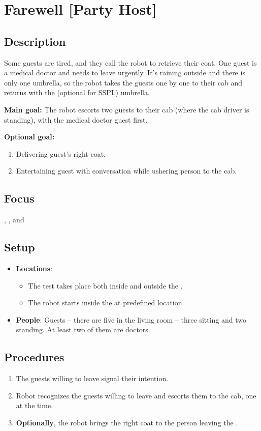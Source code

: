 \section{Farewell [Party Host]}
\label{test:farewell}

\subsection*{Description}
    Some guests are tired, and they call the robot to retrieve their coat. One guest is a medical doctor and needs to leave urgently. It's raining outside and there is only one umbrella, so the robot takes the guests one by one to their cab and returns with the (optional for SSPL) umbrella.


\textbf{Main goal:}
The robot escorts two guests to their cab (where the cab driver is standing), with the medical doctor guest first.


\textbf{Optional goal:}
\begin{enumerate}[nosep]
	\item Delivering guest's right coat.
	\item Entertaining guest with conversation while ushering person to the cab.
\end{enumerate}

\subsection*{Focus}
\PerDet{}, \NAV{}, and \HRI{}

\subsection*{Setup}
\begin{itemize}
	\item \textbf{Locations}: 
		\begin{itemize}
		 \item The test takes place both inside and outside the \Arena{}.
		 \item The robot starts inside the \Arena{} at predefined location.
		\end{itemize}
	\item \textbf{People}: Guests -- there are five  in the living room -- three sitting and two standing. At least two of them are doctors.
\end{itemize}

\subsection*{Procedures}
\begin{enumerate}
	\item The guests willing to leave signal their intention.
	\item Robot recognizes the guests willing to leave and escorts them to the cab, one at the time.
	\item \textbf{Optionally}, the robot brings the right coat to the person leaving the \Arena{}.
\end{enumerate}

